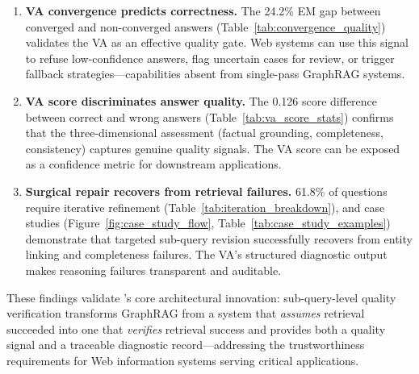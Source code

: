 \begin{enumerate}
  \item \textbf{VA convergence predicts correctness.} The 24.2\% EM gap between
        converged and non-converged answers (Table~\ref{tab:convergence_quality})
        validates the VA as an effective quality gate. Web systems can use this
        signal to refuse low-confidence answers, flag uncertain cases for review,
        or trigger fallback strategies---capabilities absent from single-pass
        GraphRAG systems.

  \item \textbf{VA score discriminates answer quality.} The 0.126 score difference
        between correct and wrong answers (Table~\ref{tab:va_score_stats}) confirms
        that the three-dimensional assessment (factual grounding, completeness,
        consistency) captures genuine quality signals. The VA score can be exposed
        as a confidence metric for downstream applications.

  \item \textbf{Surgical repair recovers from retrieval failures.} 61.8\% of
        questions require iterative refinement (Table~\ref{tab:iteration_breakdown}),
        and case studies (Figure~\ref{fig:case_study_flow},
        Table~\ref{tab:case_study_examples}) demonstrate that targeted sub-query
        revision successfully recovers from entity linking and completeness
        failures. The VA's structured diagnostic output makes reasoning failures
        transparent and auditable.
\end{enumerate}

These findings validate \sys's core architectural innovation: sub-query-level
quality verification transforms GraphRAG from a system that \emph{assumes}
retrieval succeeded into one that \emph{verifies} retrieval success and provides
both a quality signal and a traceable diagnostic record---addressing the
trustworthiness requirements for Web information systems serving critical
applications.

